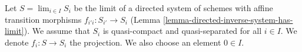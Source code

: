 \begin{situation}
\label{situation-descent}
Let $S = \lim_{i \in I} S_i$ be the limit of a directed system of schemes
with affine transition morphisms $f_{i'i} : S_{i'} \to S_i$
(Lemma \ref{lemma-directed-inverse-system-has-limit}).
We assume that $S_i$ is quasi-compact and quasi-separated for all $i \in I$.
We denote $f_i : S \to S_i$ the projection.
We also choose an element $0 \in I$.
\end{situation}
